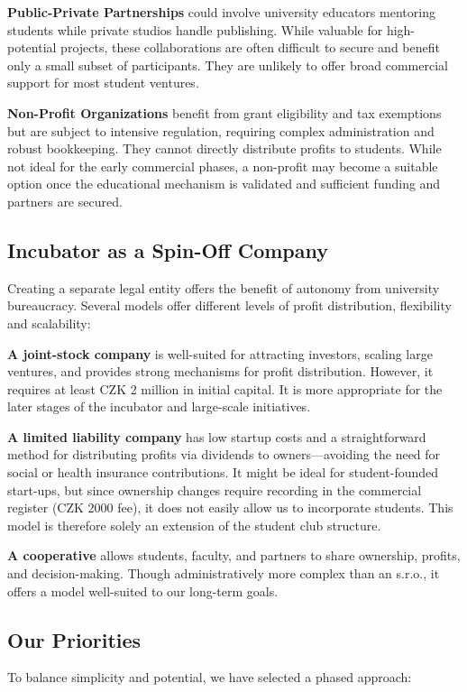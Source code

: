 \textbf{Public-Private Partnerships} could involve university educators mentoring students while private studios handle publishing. While valuable for high-potential projects, these collaborations are often difficult to secure and benefit only a small subset of participants. They are unlikely to offer broad commercial support for most student ventures.

\textbf{Non-Profit Organizations} benefit from grant eligibility and tax exemptions but are subject to intensive regulation, requiring complex administration and robust bookkeeping. They cannot directly distribute profits to students. While not ideal for the early commercial phases, a non-profit may become a suitable option once the educational mechanism is validated and sufficient funding and partners are secured.

\subsection{Incubator as a Spin-Off Company}
Creating a separate legal entity offers the benefit of autonomy from university bureaucracy. Several models offer different levels of profit distribution, flexibility and scalability:

\textbf{A joint-stock company} is well-suited for attracting investors, scaling large ventures, and provides strong mechanisms for profit distribution. However, it requires at least CZK 2 million in initial capital. It is more appropriate for the later stages of the incubator and large-scale initiatives.

\textbf{A limited liability company} has low startup costs and a straightforward method for distributing profits via dividends to owners—avoiding the need for social or health insurance contributions. It might be ideal for student-founded start-ups, but since ownership changes require recording in the commercial register (CZK 2000 fee), it does not easily allow us to incorporate students. This model is therefore solely an extension of the student club structure.

\textbf{A cooperative} allows students, faculty, and partners to share ownership, profits, and decision-making. Though administratively more complex than an s.r.o., it offers a model well-suited to our long-term goals.

\subsection{Our Priorities}
To balance simplicity and potential, we have selected a phased approach:

